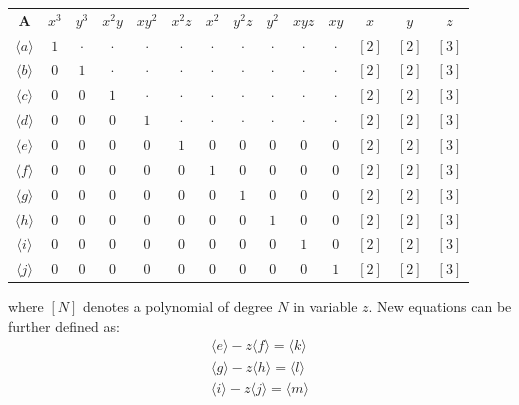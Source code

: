 \documentclass[a4paper]{report}
\begin{document}
\begin{center}
	\begin{tabular}{ |c|cccccccccc|ccc|} 
		\hline
		$\mathbf{A}$ & $x^3$ & $y^3$ & $x^2y$ & $xy^2$ & $x^2z$ & $x^2$ & $y^2z$ & $y^2$ & $xyz$ & $xy$ & $x$ & $y$ & $z$ \\
		$\langle a \rangle$ & $1$ & $\cdot$ & $\cdot$ & $\cdot$ & $\cdot$ & $\cdot$ & $\cdot$ & $\cdot$ & $\cdot$ & $\cdot$ & $\left[2\right]$ & $\left[2\right]$ & $\left[3\right]$  \\
		$\langle b \rangle$ & $0$ & $1$ & $\cdot$ & $\cdot$ & $\cdot$ & $\cdot$ & $\cdot$ & $\cdot$ & $\cdot$ & $\cdot$  & $\left[2\right]$ & $\left[2\right]$ & $\left[3\right]$  \\
		$\langle c \rangle$ & $0$ & $0$ & $1$ & $\cdot$ & $\cdot$ & $\cdot$ & $\cdot$ & $\cdot$ & $\cdot$ & $\cdot$ & $\left[2\right]$ & $\left[2\right]$ & $\left[3\right]$  \\
		$\langle d \rangle$ & $0$ & $0$ & $0$ & $1$ & $\cdot$ & $\cdot$ & $\cdot$ & $\cdot$ & $\cdot$ & $\cdot$ & $\left[2\right]$ & $\left[2\right]$ & $\left[3\right]$  \\
		$\langle e \rangle$ & $0$ & $0$ & $0$ & $0$ & $1$ & $0$ & $0$ & $0$ & $0$ & $0$ & $\left[2\right]$ & $\left[2\right]$ & $\left[3\right]$  \\
		$\langle f \rangle$ & $0$ & $0$ & $0$ & $0$ & $0$ & $1$ & $0$ & $0$ & $0$ & $0$ & $\left[2\right]$ & $\left[2\right]$ & $\left[3\right]$  \\
		$\langle g \rangle$ & $0$ & $0$ & $0$ & $0$ & $0$ & $0$ & $1$ & $0$ & $0$ & $0$ & $\left[2\right]$ & $\left[2\right]$ & $\left[3\right]$  \\
		$\langle h \rangle$ & $0$ & $0$ & $0$ & $0$ & $0$ & $0$ & $0$ & $1$ & $0$ & $0$ & $\left[2\right]$ & $\left[2\right]$ & $\left[3\right]$  \\
		$\langle i \rangle$ & $0$ & $0$ & $0$ & $0$ & $0$ & $0$ & $0$ & $0$ & $1$ & $0$ & $\left[2\right]$ & $\left[2\right]$ & $\left[3\right]$  \\
		$\langle j \rangle$ & $0$ & $0$ & $0$ & $0$ & $0$ & $0$ & $0$ & $0$ & $0$ & $1$ & $\left[2\right]$ & $\left[2\right]$ & $\left[3\right]$  \\
		\hline
	\end{tabular}
\end{center}
where $[N]$ denotes a polynomial of degree $N$ in variable $z$. New equations can be further defined as:
\begin{align*}
\langle e \rangle - z \langle f \rangle = \langle k \rangle \\
\langle g \rangle - z \langle h \rangle = \langle l \rangle \\
\langle i \rangle - z \langle j \rangle = \langle m \rangle
\end{align*}
\end{document}
